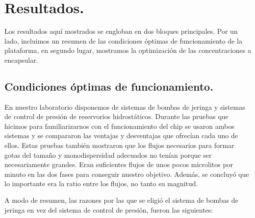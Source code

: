 \section{Resultados.}\label{sec:4_resultados}

Los resultados aquí mostrados se engloban en dos bloques principales. Por un lado, incluimos un resumen de las condiciones óptimas de funcionamiento de la plataforma, en segundo lugar, mostramos la optimización de las concentraciones a encapsular. 

\subsection{Condiciones óptimas de funcionamiento.}\label{sec:4_resultados_puesta_a_punto}

En nuestro laboratorio disponemos de sistemas de bombas de jeringa y sistemas de control de presión de reservorios hidrostáticos. Durante las pruebas que hicimos para familiarizarnos con el funcionamiento del chip se usaron ambos sistemas y se compararon las ventajas y desventajas que ofrecían cada uno de ellos. Estas pruebas también mostraron que los flujos necesarios para formar gotas del tamaño y monodispersidad adecuados no tenían porque ser necesariamente grandes. Eran suficientes flujos de unos pocos microlitos por minuto en las dos fases para conseguir nuestro objetivo. Además, se concluyó que lo importante era la ratio entre los flujos, no tanto su magnitud.

A modo de resumen, las razones por las que se eligió el sistema de bombas de jeringa en vez del sistema de control de presión, fueron las siguientes:

